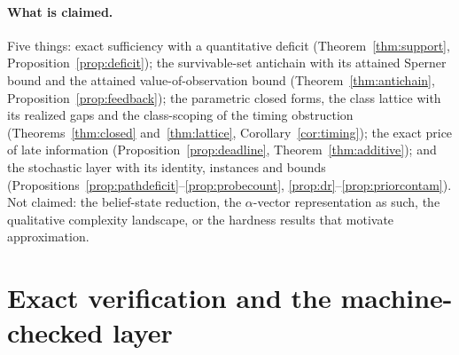 \documentclass[11pt,a4paper]{article}
\theoremstyle{plain}
\theoremstyle{definition}
\theoremstyle{remark}
\begin{document}
\paragraph{What is claimed.}
Five things: exact sufficiency with a quantitative deficit (Theorem~\ref{thm:support}, Proposition~\ref{prop:deficit}); the survivable-set antichain with its attained Sperner bound and the attained value-of-observation bound (Theorem~\ref{thm:antichain}, Proposition~\ref{prop:feedback}); the parametric closed forms, the class lattice with its realized gaps and the class-scoping of the timing obstruction (Theorems~\ref{thm:closed} and~\ref{thm:lattice}, Corollary~\ref{cor:timing}); the exact price of late information (Proposition~\ref{prop:deadline}, Theorem~\ref{thm:additive}); and the stochastic layer with its identity, instances and bounds (Propositions~\ref{prop:pathdeficit}--\ref{prop:probecount}, \ref{prop:dr}--\ref{prop:priorcontam}). Not claimed: the belief-state reduction, the $\alpha$-vector representation as such, the qualitative complexity landscape, or the hardness results that motivate approximation.
\section{Exact verification and the machine-checked layer}\label{sec:verification}
\end{document}
